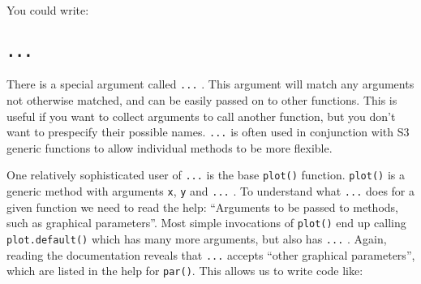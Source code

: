 \begin{Shaded}
\begin{Highlighting}[]
\NormalTok{(}\NormalTok{)}
\end{Highlighting}
\end{Shaded}

You could write:

\begin{Shaded}
\begin{Highlighting}[]
\NormalTok{!}\StringTok{ }\NormalTok{(}\NormalTok{)}
\end{Highlighting}
\end{Shaded}

\subsection{\texttt{...}}

There is a special argument called \texttt{...} . This argument will
match any arguments not otherwise matched, and can be easily passed on
to other functions. This is useful if you want to collect arguments to
call another function, but you don't want to prespecify their possible
names. \texttt{...} is often used in conjunction with S3 generic
functions to allow individual methods to be more flexible. 

One relatively sophisticated user of \texttt{...} is the base
\texttt{plot()} function. \texttt{plot()} is a generic method with
arguments \texttt{x}, \texttt{y} and \texttt{...} . To understand what
\texttt{...} does for a given function we need to read the help:
``Arguments to be passed to methods, such as graphical parameters''.
Most simple invocations of \texttt{plot()} end up calling
\texttt{plot.default()} which has many more arguments, but also has
\texttt{...} . Again, reading the documentation reveals that
\texttt{...} accepts ``other graphical parameters'', which are listed in
the help for \texttt{par()}. This allows us to write code like:

\begin{Shaded}
\begin{Highlighting}[]
\NormalTok{(}\NormalTok{:}\NormalTok{, } \NormalTok{)}
\NormalTok{(}\NormalTok{:}\NormalTok{, } \NormalTok{, } \NormalTok{)}
\end{Highlighting}
\end{Shaded}

